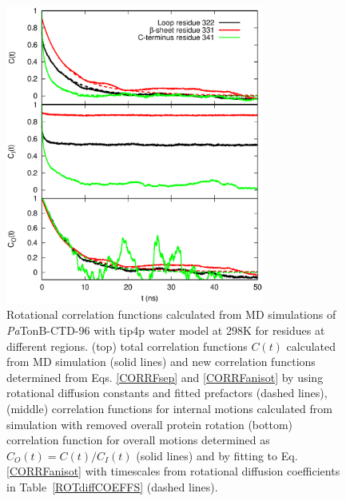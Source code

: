 \documentclass[journal=jpcbfk,manuscript=article]{achemso}
\begin{document}
\begin{figure}[!h]
  \includegraphics[width=8.5cm]{../Figs/exampleCORRF2.eps}%
  \caption{Rotational correlation functions calculated from MD simulations of {\it Pa}TonB-CTD-96 with tip4p water
    model at 298K for residues at different regions.
    (top) total correlation functions $C(t)$ calculated from MD simulation (solid lines) and
    new correlation functions determined from Eqs. \ref{CORRFsep} and \ref{CORRFanisot} by
    using rotational diffusion constants and fitted prefactors (dashed lines),
    (middle) correlation functions for internal motions calculated from simulation with removed overall protein rotation
    (bottom) correlation function for overall motions determined as $C_O(t)=C(t)/C_I(t)$ (solid lines) and by fitting
    to Eq. \ref{CORRFanisot} with timescales from rotational diffusion coefficients in Table~\ref{ROTdiffCOEFFS} (dashed lines).
    }\label{exampleCORRF}
\end{figure}
\end{document}
